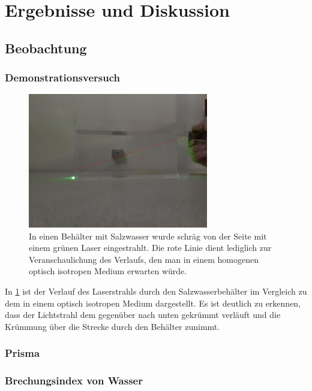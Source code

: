 \documentclass[
	a4paper,
	12pt,
	pagesize,
	ngerman
]{scrartcl}
\begin{document}
	\section{Ergebnisse und Diskussion}
	

	\subsection{Beobachtung}
	\subsubsection{Demonstrationsversuch}
	\begin{figure}[H]
		\includegraphics[width=0.7\textwidth]{Salzwasser}
		\centering
		\caption{In einen Behälter mit Salzwasser wurde schräg von der Seite mit einem grünen Laser eingestrahlt. Die rote Linie dient lediglich zur Veranschaulichung des Verlaufs, den man in einem homogenen optisch isotropen Medium erwarten würde.} 
		\label{fig_salzwasser}
		\centering
	\end{figure}
	
	In \cref{fig_salzwasser} ist der Verlauf des Laserstrahls durch den Salzwasserbehälter im Vergleich zu dem in einem optisch isotropen Medium dargestellt.
	Es ist deutlich zu erkennen, dass der Lichtstrahl dem gegenüber nach unten gekrümmt verläuft und die Krümmung über die Strecke durch den Behälter zunimmt.
	\subsubsection{Prisma} %
	\subsubsection{Brechungsindex von Wasser}
\end{document}
